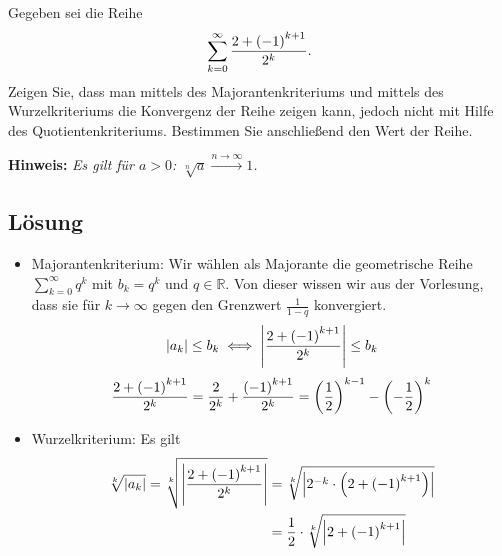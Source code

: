 \documentclass[german,12pt]{homework}
\newcommand{\RR}{\mathbb{R}}
\DeclarePairedDelimiter{\absolute}{\lvert}{\rvert}
\DeclarePairedDelimiter{\enbrace}{(}{)}
\begin{document}
    \begin{problem}
        Gegeben sei die Reihe
        \[\sum_{k = 0}^\infty\frac{2 + \enbrace*{-1}^{k + 1}}{2^k}.\]
        Zeigen Sie, dass man mittels des Majorantenkriteriums und mittels des
        Wurzelkriteriums die Konvergenz der Reihe zeigen kann, jedoch nicht mit
        Hilfe des Quotientenkriteriums. Bestimmen Sie anschließend den Wert der
        Reihe.

        \textbf{Hinweis:} \quad \emph{Es gilt für \(a > 0\): \(\sqrt[n]{a}
        \xrightarrow{n \to \infty} 1\).}
    \end{problem}

    \subsection*{Lösung}
    \begin{itemize}
        \item Majorantenkriterium: Wir wählen als Majorante die geometrische Reihe \(\sum_{k = 0}^\infty{q}^k\) mit \(b_k = q^k\) und \(q \in \RR\).
        Von dieser wissen wir aus der Vorlesung, dass sie für \(k \to \infty\)
        gegen den Grenzwert \(\frac{1}{1 - q}\) konvergiert.
        \begin{align*}
            \absolute*{a_k} \le b_k \iff \absolute*{\frac{2 + \enbrace*{-1}^{k + 1}}{2^k}} \le b_k
        \end{align*}
        \[\frac{2 + \enbrace*{-1}^{k + 1}}{2^k} = \frac{2}{2^k} +
        \frac{\enbrace*{-1}^{k + 1}}{2^k} = \enbrace*{\frac{1}{2}}^{k - 1}
        - \enbrace*{-\frac{1}{2}}^k\]
        \item Wurzelkriterium: Es gilt
        \begin{align*}
            \sqrt[k]{\absolute*{a_k}} = \sqrt[k]{\absolute*{\frac{2 + \enbrace*{-1}^{k + 1}}{2^k}}} &= \sqrt[k]{\absolute*{2^{-k} \cdot \enbrace*{2 + \enbrace*{-1}^{k + 1}}}}\\
            &= \frac{1}{2} \cdot \sqrt[k]{\absolute*{2 + \enbrace*{-1}^{k + 1}}}\\

\end{align*}
\end{itemize}
\end{document}
